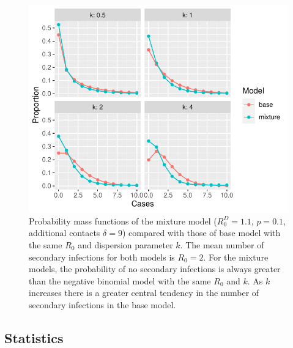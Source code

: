 \documentclass{imammb}
\numberwithin{equation}{section}
\begin{document}
\begin{figure}[!t] %
\centering\includegraphics {Figure1.pdf}
\caption{Probability mass functions of the mixture model ($R_0^D=1.1$, $p=0.1$, additional contacts $\delta =9$) compared with those of base model with the same $R_0$ and dispersion parameter $k$. The mean number of secondary infections for both models is $R_0 =2$. For the mixture models, the probability of no secondary infections is always greater than the negative binomial model with the same $R_0$ and $k$. As $k$ increases there is a greater central tendency in the number of secondary infections in the base model.  }
\label{fig:pmf}\vspace*{-9pt}
\end{figure}



\subsection{Statistics} %
\end{document}
